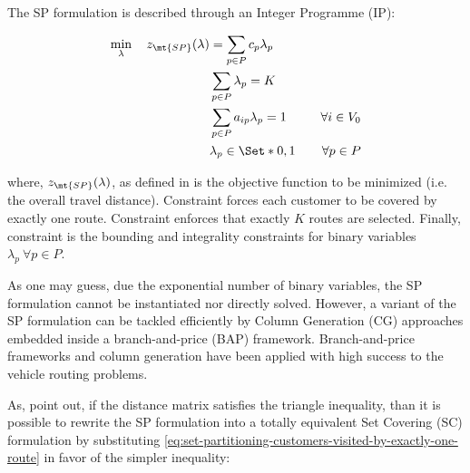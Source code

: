 The SP formulation is described through an Integer Programme (IP):

\begin{align}
	\min_{\lambda} \quad z_\mt{SP}(\lambda) & = \sum_{p \in P}  c_p \lambda_p \label{eq:set-partitioning-obj-func}                                                                                                                                           \\
	                                        & \sum_{p \in P} \lambda_{p} = K\label{eq:set-partitioning-K-routes}                                                                                                                                             \\
	                                        & \sum_{p \in P}  a_{ip} \lambda_p = 1                                 & \quad \forall i \in V_0                                              \label{eq:set-partitioning-customers-visited-by-exactly-one-route} \\
	                                        & \lambda_p                    \in \Set*{0, 1}                         & \quad \forall p \in P \label{eq:set-partitioning-lambda-mip-var-bounds}
\end{align}

where, $z_\mt{SP}(\lambda)$, as defined in  is the objective function to be minimized (i.e. the overall travel distance).
Constraint  forces each customer to be covered by exactly one route.
Constraint  enforces that exactly $K$ routes are selected.
Finally, constraint  is the bounding and integrality constraints for binary variables $\lambda_p \ \forall p \in P$.

As one may guess,
due the exponential number of binary variables,
the SP formulation cannot be instantiated nor directly solved.
However,
a variant of the SP formulation can be tackled efficiently by Column Generation (CG) approaches
embedded inside a branch-and-price (BAP) framework.
Branch-and-price frameworks and column generation have been applied
with high success to the vehicle routing problems.

As, \textcite{toth2002} point out, if the distance matrix satisfies the triangle inequality,
than it is possible to rewrite the SP formulation into a totally equivalent Set Covering (SC) formulation
by substituting \cref{eq:set-partitioning-customers-visited-by-exactly-one-route} in favor of the simpler inequality:

